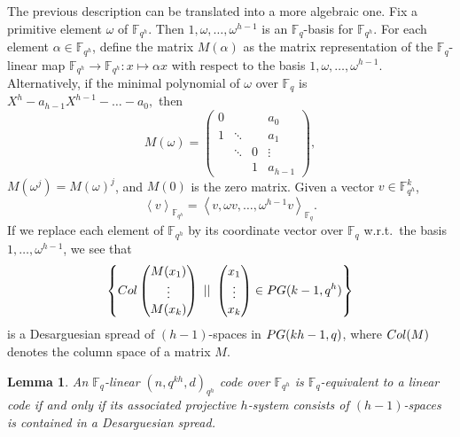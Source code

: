 \documentclass[a4paper]{article}
\newtheorem{lm}[thm]{Lemma}
\theoremstyle{definition}
\newcommand{\FF}{\mathbb F}
\newcommand{\vspan}[1]{\left \langle #1 \right \rangle}
\newcommand{\sett}[2]{ \left\{ #1 \, \, || \, \, #2 \right \} }
\newcommand{\pg}{\textnormal{PG}}
\newcommand{\col}{\textnormal{Col}}
\begin{document}
The previous description can be translated into a more algebraic one.
Fix a primitive element $\omega$ of $\FF_{q^h}$.
Then $1, \omega, \dots, \omega^{h-1}$ is an $\FF_q$-basis for $\FF_{q^h}$.
For each element $\alpha \in \FF_{q^h}$, define the matrix $M(\alpha)$ as the matrix representation of the $\FF_q$-linear map 
\(
\FF_{q^h} \to \FF_{q^h}: x \mapsto \alpha x
\)
with respect to the basis $1, \omega, \dots, \omega^{h-1}$.
Alternatively, if the minimal polynomial of $\omega$ over $\FF_q$ is
\(
X^h - a_{h-1} X^{h-1} - \ldots - a_0,
\)
then
\[
 M(\omega) = \begin{pmatrix}
 0 & & & a_0 \\
 1 & \ddots & & a_1 \\
   & \ddots & 0  & \vdots \\
   & & 1 &  a_{h-1} 
 \end{pmatrix},
\]
$M(\omega^j) = M(\omega)^j$, and $M(0)$ is the zero matrix.
Given a vector $v \in \FF_{q^h}^k$,
\[
 \vspan v _{\FF_{q^h}} = \vspan{v, \omega v, \dots, \omega^{h-1} v }_{\FF_q}.
\]
If we replace each element of $\FF_{q^h}$ by its coordinate vector over $\FF_q$ w.r.t.\ the basis $1, \dots, \omega^{h-1}$, we see that
\[
 \sett{\col \begin{pmatrix} M(x_1) \\ \vdots \\ M(x_k) \end{pmatrix} }{ \begin{pmatrix} x_1 \\ \vdots \\ x_k \end{pmatrix} \in \pg(k-1,q^h) }
\]
is a Desarguesian spread of $(h-1)$-spaces in $\pg(kh-1,q)$, where $\col(M)$ denotes the column space of a matrix $M$.

\begin{lm}
 An $\FF_q$-linear $(n,q^{kh},d)_{q^h}$ code over $\FF_{q^h}$ is $\FF_q$-equivalent to a linear code if and only if its associated projective $h$-system consists of $(h-1)$-spaces is contained in a Desarguesian spread.
\end{lm}
\end{document}
